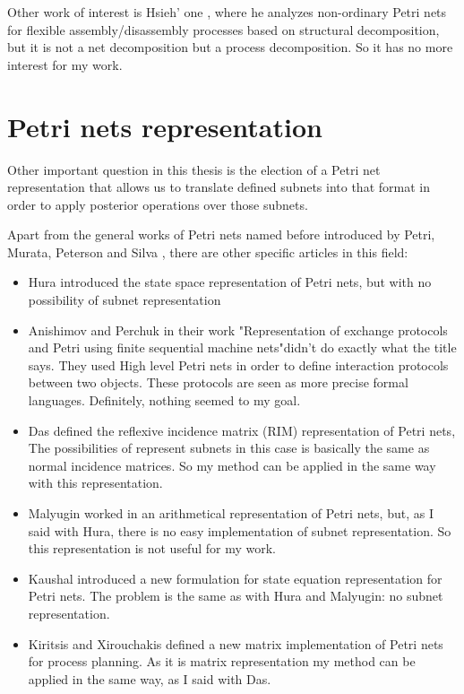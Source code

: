 Other work of interest is Hsieh' one \cite{G-PROP-Hsieh2011496}, where he
analyzes non-ordinary Petri nets for flexible assembly/disassembly processes
based on structural decomposition, but it is not a net decomposition but a process decomposition. So it has no more interest for my work. 

\section{Petri nets representation}

Other important question in this thesis is the election of a Petri net representation
that allows us to translate defined subnets into that format in order to
apply posterior operations over those subnets.

Apart from the general works of Petri nets named before
introduced by Petri, Murata, Peterson and Silva \citep{G-Petri1962PhD,G-Petri1966,G-Petri1976,G-Murata1977412,G-SM-Murata19772,G-EPN-Peterson1981,G-Silva1985,G-Murata1989541,G-Silva1993,G-Silva201213},
there are other specific articles in this field:
\begin{itemize}
\item Hura \cite{REP-Hura1984865} introduced the state space representation of Petri nets, but with no possibility of subnet representation
\item Anishimov and Perchuk \cite{REP-Anisimov198690} in their work "Representation
of exchange protocols and Petri using finite sequential machine nets"didn't do exactly what the title says. They used High level Petri nets in order to define interaction protocols between two objects. These protocols are seen as more precise formal languages. Definitely, nothing seemed to my goal.   
\item Das \cite{REP-Das1987643} defined the
reflexive incidence matrix (RIM) representation of Petri nets, The possibilities
of represent subnets in this case is basically the same as 
normal incidence matrices. So my method can be applied in the same way with
this representation.
\item Malyugin \cite{REP-Malyugin1987696} worked in an arithmetical representation
of Petri nets, but, as I said with Hura, there is no easy implementation
of subnet representation.
So this representation is not useful for my work.
\item Kaushal \cite{REP-Kaushal19921083} introduced a new formulation for
state equation representation for Petri nets. The problem is the same as
with Hura and Malyugin: no subnet representation.
\item Kiritsis and Xirouchakis \cite{REP-Kiritisis2001173} defined a new
matrix implementation of Petri nets for process planning. As it is matrix representation my method can be applied in the same way, as I said with Das.  \end{itemize}
 

